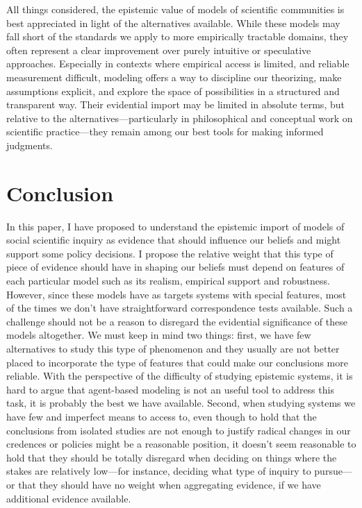 \documentclass{article}
\begin{document}
All things considered, the epistemic value of models of scientific communities is best appreciated in light of the alternatives available. While these models may fall short of the standards we apply to more empirically tractable domains, they often represent a clear improvement over purely intuitive or speculative approaches. Especially in contexts where empirical access is limited, and reliable measurement difficult, modeling offers a way to discipline our theorizing, make assumptions explicit, and explore the space of possibilities in a structured and transparent way. Their evidential import may be limited in absolute terms, but relative to the alternatives—particularly in philosophical and conceptual work on scientific practice—they remain among our best tools for making informed judgments.

\section{Conclusion}

In this paper, I have proposed to understand the epistemic import of models of social scientific inquiry as evidence that should influence our beliefs and might support some policy decisions. I propose the relative weight that this type of piece of evidence should have in shaping our beliefs must depend on features of each particular model such as its realism, empirical support and robustness. However, since these models have as targets systems with special features, most of the times we don't have straightforward correspondence tests available. Such a challenge should not be a reason to disregard the evidential significance of these models altogether. We must keep in mind two things: first, we have few alternatives to study this type of phenomenon and they usually are not better placed to incorporate the type of features that could make our conclusions more reliable. With the perspective of the difficulty of studying epistemic systems, it is hard to argue that agent-based modeling is not an useful tool to address this task, it is probably the best we have available. Second, when studying systems we have few and imperfect means to access to, even though to hold that the conclusions from isolated studies are not enough to justify radical changes in our credences or policies might be a reasonable position, it doesn't seem reasonable to hold that they should be totally disregard when deciding on things where the stakes are relatively low—for instance, deciding what type of inquiry to pursue—or that they should have no weight when aggregating evidence, if we have additional evidence available.
\end{document}
